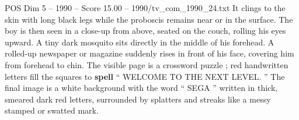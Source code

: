 \begin{textsample}{POS Dim 5 – 1990 – Score 15.00 – 1990/tv\_com\_1990\_24.txt}
It clings to the skin with long black legs while the proboscis remains near or in the surface.
The boy is then seen in a close-up from above, seated on the couch, rolling his eyes upward.
A tiny dark mosquito sits directly in the middle of his forehead.
A rolled-up newspaper or magazine suddenly rises in front of his face, covering him from forehead to chin.
The visible page is a crossword puzzle ; red handwritten letters fill the squares to \textbf{spell} “ WELCOME TO THE NEXT LEVEL. ” The final image is a white background with the word “ SEGA ” written in thick, smeared dark red letters, surrounded by splatters and streaks like a messy stamped or swatted mark.

\end{textsample}
